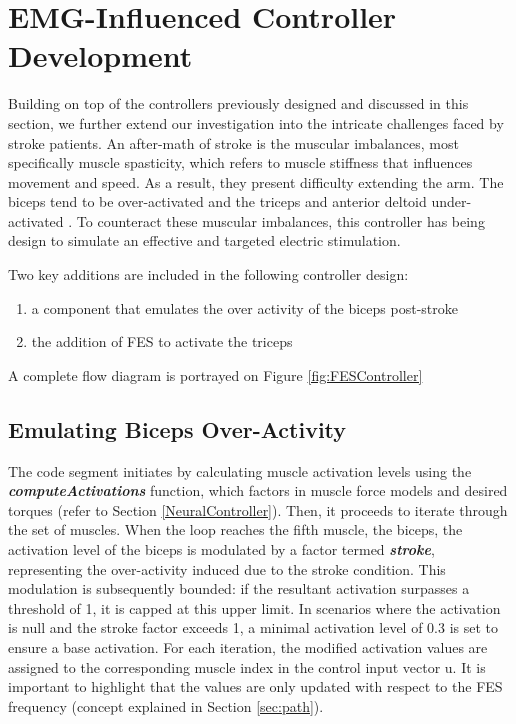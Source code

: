 \newpage
\section{EMG-Influenced Controller Development}

Building on top of the controllers previously designed and discussed in this section, we further extend our investigation into the intricate challenges faced by stroke patients. An after-math of stroke is the muscular imbalances, most specifically muscle spasticity, which refers to muscle stiffness that influences movement and speed. As a result, they present difficulty extending the arm. The biceps tend to be over-activated and the triceps and anterior deltoid under-activated \cite{IOL}. To counteract these muscular imbalances, this controller has being design to simulate an effective and targeted electric stimulation. 

Two key additions are included in the following controller design:

\begin{enumerate}
    \item a component that emulates the over activity of the biceps post-stroke 
    \item the addition of FES to activate the triceps
\end{enumerate}

A complete flow diagram is portrayed on Figure \ref{fig:FESController}

\subsection{Emulating Biceps Over-Activity}

The code segment initiates by calculating muscle activation levels using the \textbf{\textit{computeActivations}} function, which factors in muscle force models and desired torques  (refer to Section \ref{NeuralController}). Then, it proceeds to iterate through the set of  muscles. When the loop reaches the fifth muscle, the biceps, the activation level of the biceps is modulated by a factor termed \textbf{\textit{stroke}}, representing the over-activity induced due to the stroke condition. This modulation is subsequently bounded: if the resultant activation surpasses a threshold of 1, it is capped at this upper limit. In scenarios where the activation is null and the stroke factor exceeds 1, a minimal activation level of 0.3 is set to ensure a base activation. For each iteration, the modified activation values are assigned to the corresponding muscle index in the control input vector u. It is important to highlight that the values are only updated with respect to the FES frequency (concept explained in Section \ref{sec:path}).

